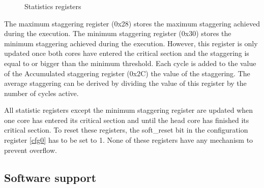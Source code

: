 \begin{figure}[H]
	\begin{center}
		 \\
		 \\
		 \\
		 \\
		 \\
		 \\
		 \\
		 \\
		 \\
		 \\
		\end{center}
	\caption{Statistics registers}\label{fig:reg_statistics}
\end{figure}

The maximum staggering register (0x28) stores the maximum staggering achieved during the execution. The minimum staggering register (0x30) stores the minimum staggering achieved during the execution. However, this register is only updated once both cores have entered the critical section and the staggering is equal to or bigger than the minimum threshold. Each cycle is added to the value of the Accumulated staggering register (0x2C) the value of the staggering. The average staggering can be derived by dividing the value of this register by the number of cycles active.

All statistic registers except the minimum staggering register are updated when one core has entered its critical section and until the head core has finished its critical section. To reset these registers, the soft\_reset bit in the configuration register \ref{cfg0} has to be set to 1. None of these registers have any mechanism to prevent overflow.

\hspace{1cm}



\subsection{Software support}

